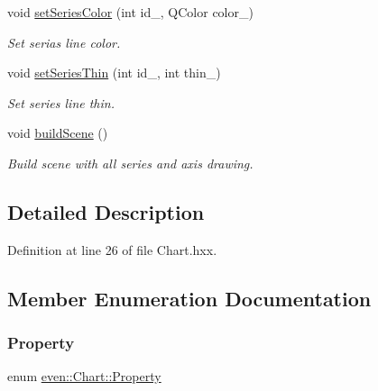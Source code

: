 \begin{DoxyCompactItemize}
void \mbox{\hyperlink{classeven_1_1_chart_a8b7c917c9da710f11a459ac917428af1}{set\+Series\+Color}} (int id\+\_\+, Q\+Color color\+\_\+)
\begin{DoxyCompactList}\small\item\em Set serias line color. \end{DoxyCompactList}\item 
\mbox{\label{classeven_1_1_chart_ae6a0f7c9ef4ab8063592e6ed3a7f94bf}} 
void \mbox{\hyperlink{classeven_1_1_chart_ae6a0f7c9ef4ab8063592e6ed3a7f94bf}{set\+Series\+Thin}} (int id\+\_\+, int thin\+\_\+)
\begin{DoxyCompactList}\small\item\em Set series line thin. \end{DoxyCompactList}\item 
\mbox{\label{classeven_1_1_chart_a42018152a50ed88bb3ee0e0b0fc4e0d8}} 
void \mbox{\hyperlink{classeven_1_1_chart_a42018152a50ed88bb3ee0e0b0fc4e0d8}{build\+Scene}} ()
\begin{DoxyCompactList}\small\item\em Build scene with all series and axis drawing. \end{DoxyCompactList}\end{DoxyCompactItemize}


\subsection{Detailed Description}


Definition at line 26 of file Chart.\+hxx.



\subsection{Member Enumeration Documentation}
\mbox{\label{classeven_1_1_chart_aba4e4fe076d6d3d4682ec5e67ec68b66}} 
\subsubsection{\texorpdfstring{Property}{Property}}
{\footnotesize\ttfamily enum \mbox{\hyperlink{classeven_1_1_chart_aba4e4fe076d6d3d4682ec5e67ec68b66}{even\+::\+Chart\+::\+Property}}}



